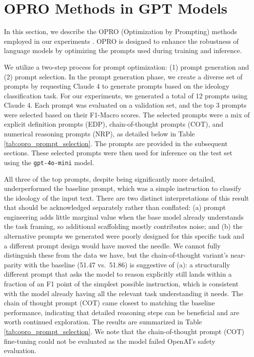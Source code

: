 \chapter{OPRO Methods in GPT Models}
\label{appendix:opro}
In this section, we describe the OPRO (Optimization by Prompting) methods employed in our experiments \citep{yang2024largelanguagemodelsoptimizers}. OPRO is designed to enhance the robustness of language models by optimizing the prompts used during training and inference.

We utilize a two-step process for prompt optimization: (1) prompt generation and (2) prompt selection. In the prompt generation phase, we create a diverse set of prompts by requesting Claude 4 to generate prompts based on the ideology classification task. For our experiments, we generated a total of 12 prompts using Claude 4. Each prompt was evaluated on a validation set, and the top 3 prompts were selected based on their F1-Macro scores. The selected prompts were a mix of explicit definition prompts (EDP), chain-of-thought prompts (COT), and numerical reasoning prompts (NRP), as detailed below in Table \ref{tab:opro_prompt_selection}. The prompts are provided in the subsequent sections. These selected prompts were then used for inference on the test set using the \texttt{gpt-4o-mini} model.

All three of the top prompts, despite being significantly more detailed, underperformed the baseline prompt, which was a simple instruction to classify the ideology of the input text. There are two distinct interpretations of this result that should be acknowledged separately rather than conflated: (a) prompt engineering adds little marginal value when the base model already understands the task framing, so additional scaffolding mostly contributes noise; and (b) the alternative prompts we generated were poorly designed for this specific task and a different prompt design would have moved the needle. We cannot fully distinguish these from the data we have, but the chain-of-thought variant's near-parity with the baseline (51.47 vs.\ 51.86) is suggestive of (a): a structurally different prompt that asks the model to reason explicitly still lands within a fraction of an F1 point of the simplest possible instruction, which is consistent with the model already having all the relevant task understanding it needs. The chain of thought prompt (COT) came closest to matching the baseline performance, indicating that detailed reasoning steps can be beneficial and are worth continued exploration. The results are summarized in Table \ref{tab:opro_prompt_selection}. We note that the chain-of-thought prompt (COT) fine-tuning could not be evaluated as the model failed OpenAI's safety evaluation.

